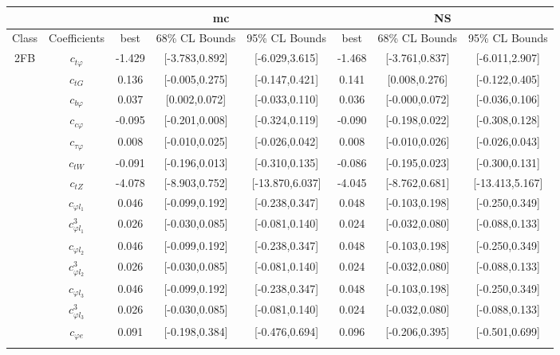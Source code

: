 \documentclass{article}
\begin{document}
\begin{table}[H]
\centering
\begin{tabular}{|c|c|c|c|c|c|c|c|}
\hline
 &  & \multicolumn{3}{c|}{mc}  & \multicolumn{3}{c|}{NS}  \\ \hline
Class & Coefficients & best & 68\% CL Bounds & 95\% CL Bounds & best & 68\% CL Bounds & 95\% CL Bounds\\ \hline
\multirow{23}{*}{2FB}
 & $c_{t \varphi}$ & -1.429 & [-3.783,0.892] & [-6.029,3.615]  & -1.468 & [-3.761,0.837] & [-6.011,2.907]  \\ \cline{2-8}
 & $c_{tG}$ & 0.136 & [-0.005,0.275] & [-0.147,0.421]  & 0.141 & [0.008,0.276] & [-0.122,0.405]  \\ \cline{2-8}
 & $c_{b \varphi}$ & 0.037 & [0.002,0.072] & [-0.033,0.110]  & 0.036 & [-0.000,0.072] & [-0.036,0.106]  \\ \cline{2-8}
 & $c_{c \varphi}$ & -0.095 & [-0.201,0.008] & [-0.324,0.119]  & -0.090 & [-0.198,0.022] & [-0.308,0.128]  \\ \cline{2-8}
 & $c_{\tau \varphi}$ & 0.008 & [-0.010,0.025] & [-0.026,0.042]  & 0.008 & [-0.010,0.026] & [-0.026,0.043]  \\ \cline{2-8}
 & $c_{tW}$ & -0.091 & [-0.196,0.013] & [-0.310,0.135]  & -0.086 & [-0.195,0.023] & [-0.300,0.131]  \\ \cline{2-8}
 & $c_{tZ}$ & -4.078 & [-8.903,0.752] & [-13.870,6.037]  & -4.045 & [-8.762,0.681] & [-13.413,5.167]  \\ \cline{2-8}
 & $c_{\varphi l_1}$ & 0.046 & [-0.099,0.192] & [-0.238,0.347]  & 0.048 & [-0.103,0.198] & [-0.250,0.349]  \\ \cline{2-8}
 & $c_{\varphi l_1}^{3}$ & 0.026 & [-0.030,0.085] & [-0.081,0.140]  & 0.024 & [-0.032,0.080] & [-0.088,0.133]  \\ \cline{2-8}
 & $c_{\varphi l_2}$ & 0.046 & [-0.099,0.192] & [-0.238,0.347]  & 0.048 & [-0.103,0.198] & [-0.250,0.349]  \\ \cline{2-8}
 & $c_{\varphi l_2}^{3}$ & 0.026 & [-0.030,0.085] & [-0.081,0.140]  & 0.024 & [-0.032,0.080] & [-0.088,0.133]  \\ \cline{2-8}
 & $c_{\varphi l_3}$ & 0.046 & [-0.099,0.192] & [-0.238,0.347]  & 0.048 & [-0.103,0.198] & [-0.250,0.349]  \\ \cline{2-8}
 & $c_{\varphi l_3}^{3}$ & 0.026 & [-0.030,0.085] & [-0.081,0.140]  & 0.024 & [-0.032,0.080] & [-0.088,0.133]  \\ \cline{2-8}
 & $c_{\varphi e}$ & 0.091 & [-0.198,0.384] & [-0.476,0.694]  & 0.096 & [-0.206,0.395] & [-0.501,0.699]  \\ \cline{2-8}

\end{tabular}
\end{table}
\end{document}
